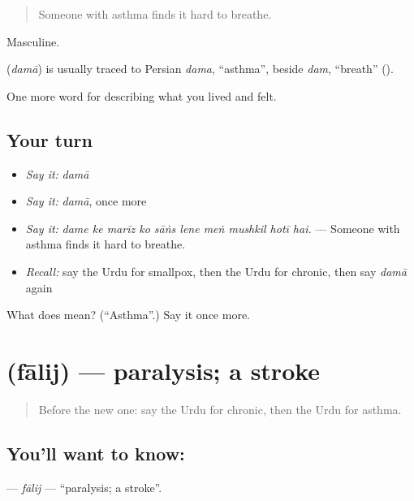 \begin{quote}
Someone with asthma finds it hard to breathe.
\end{quote}

Masculine.

\begin{cousinweb}
\textbf{} (\emph{damā}) is usually traced to Persian \emph{dama}, \textquotedblleft{}asthma\textquotedblright{}, beside \emph{dam}, \textquotedblleft{}breath\textquotedblright{} (\textbf{}).
\end{cousinweb}

\begin{grammarlens}[title={What you've built}]
One more word for describing what you lived and felt.
\end{grammarlens}

\subsection*{Your turn}
\begin{itemize}
\raggedright
  \item \emph{Say it:} \emph{damā}
  \item \emph{Say it:} \emph{damā}, once more
  \item \emph{Say it:} \emph{dame ke marīz ko sāṅs lene meṅ mushkil hotī hai.} — Someone with asthma finds it hard to breathe.
  \item \emph{Recall:} say the Urdu for smallpox, then the Urdu for chronic, then say \emph{damā} again
\end{itemize}

\begin{tcolorbox}[breakable,colback=teal!4,colframe=teal!35!black,title={Before you move on}]
What does  mean? (\textquotedblleft{}Asthma\textquotedblright{}.) Say it once more.
\end{tcolorbox}
\section[\texorpdfstring{\ur{فالج} (fālij)}{فالج (fālij)}]{ (fālij) — paralysis; a stroke}

\label{lesson:UR-C475-falij}



\begin{quote}
Before the new one: say the Urdu for chronic, then the Urdu for asthma.
\end{quote}

\subsection*{You'll want to know: }
\textbf{} — \emph{fālij} — \textquotedblleft{}paralysis; a stroke\textquotedblright{}.

